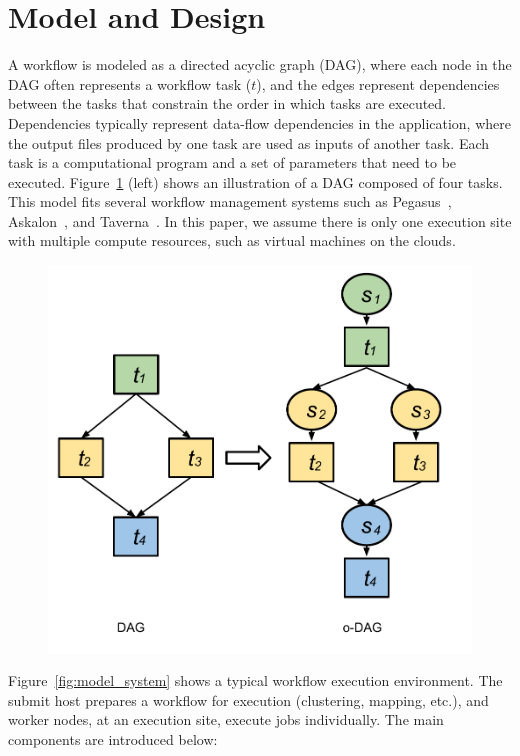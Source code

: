 \section{Model and Design}
\label{sec:model}


A workflow is modeled as a directed acyclic graph (DAG), where each node in the DAG often represents a workflow task ($t$), and the edges represent dependencies between the tasks that constrain the order in which tasks are executed. Dependencies typically represent data-flow dependencies in the application, where the output files produced by one task are used as inputs of another task. Each task is a computational program and a set of parameters that need to be executed. Figure~\ref{fig:model_odag} (left) shows an illustration of a DAG composed of four tasks. This model fits several workflow management systems such as Pegasus~\cite{Deelman:2005:PFM:1239649.1239653}, Askalon~\cite{Fahringer:2005:ATS:1064323.1064331}, and Taverna~\cite{Oinn:2006:TLC:1148437.1148448}. In this paper, we assume there is only one execution site with multiple compute resources, such as virtual machines on the clouds. 

\begin{figure}[!htb]
	\centering
	\includegraphics[width=0.7\linewidth]{figures/model/odag_color.pdf}
	\label{fig:model_odag}
\end{figure}

Figure~\ref{fig:model_system} shows a typical workflow execution environment. The submit host prepares a workflow for execution (clustering, mapping, etc.), and worker nodes, at an execution site, execute jobs individually. The main components are introduced below:

